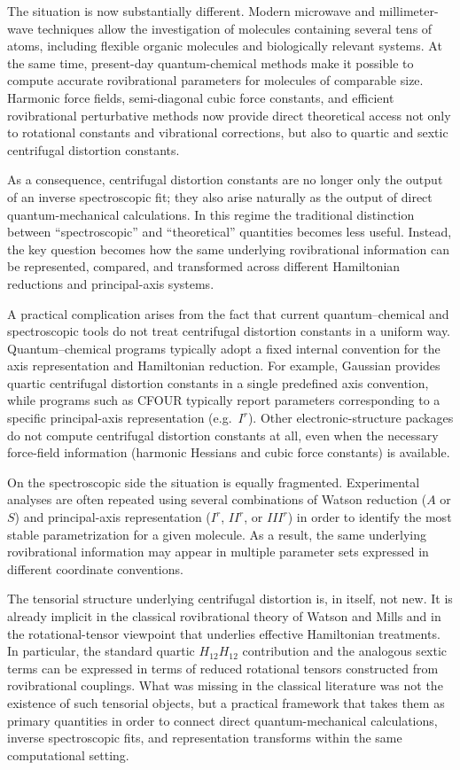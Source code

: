 The situation is now substantially different. Modern microwave and
millimeter-wave techniques allow the investigation of molecules
containing several tens of atoms, including flexible organic molecules
and biologically relevant systems. At the same time, present-day
quantum-chemical methods make it possible to compute accurate
rovibrational parameters for molecules of comparable size. Harmonic
force fields, semi-diagonal cubic force constants, and efficient
rovibrational perturbative methods now provide direct theoretical
access not only to rotational constants and vibrational corrections,
but also to quartic and sextic centrifugal distortion
constants.\cite{Mills1972,Nielsen1951}

As a consequence, centrifugal distortion constants are no longer only
the output of an inverse spectroscopic fit; they also arise naturally
as the output of direct quantum-mechanical calculations. In this
regime the traditional distinction between ``spectroscopic'' and
``theoretical'' quantities becomes less useful. Instead, the key
question becomes how the same underlying rovibrational information can
be represented, compared, and transformed across different Hamiltonian
reductions and principal-axis systems.

A practical complication arises from the fact that current
quantum--chemical and spectroscopic tools do not treat centrifugal
distortion constants in a uniform way. Quantum--chemical programs
typically adopt a fixed internal convention for the axis representation
and Hamiltonian reduction. For example, Gaussian provides quartic
centrifugal distortion constants in a single predefined axis
convention, while programs such as CFOUR typically report parameters
corresponding to a specific principal-axis representation
(e.g.\ $I^r$). Other electronic-structure packages do not compute
centrifugal distortion constants at all, even when the necessary
force-field information (harmonic Hessians and cubic force constants)
is available.

On the spectroscopic side the situation is equally fragmented.
Experimental analyses are often repeated using several combinations of
Watson reduction ($A$ or $S$) and principal-axis representation
($I^r$, $II^r$, or $III^r$) in order to identify the most stable
parametrization for a given molecule. As a result, the same underlying
rovibrational information may appear in multiple parameter sets
expressed in different coordinate conventions.

The tensorial structure underlying centrifugal distortion is, in
itself, not new. It is already implicit in the classical rovibrational
theory of Watson and Mills and in the rotational-tensor viewpoint that
underlies effective Hamiltonian treatments.\cite{Mills1972,Watson1968,Watson1977,Kirschner1983}
In particular, the standard quartic $H_{12}H_{12}$ contribution and the
analogous sextic terms can be expressed in terms of reduced rotational
tensors constructed from rovibrational couplings. What was missing in
the classical literature was not the existence of such tensorial
objects, but a practical framework that takes them as primary
quantities in order to connect direct quantum-mechanical calculations,
inverse spectroscopic fits, and representation transforms within the
same computational setting.

